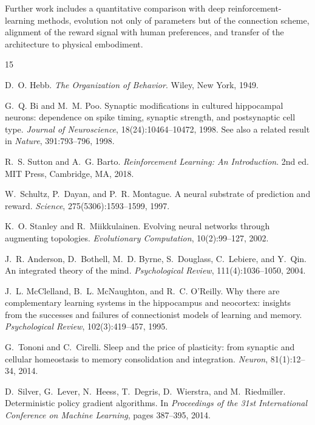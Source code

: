 \documentclass[11pt,a4paper]{article}
\begin{document}
Further work includes a quantitative comparison with deep reinforcement-learning methods, evolution not only of parameters but of the connection scheme, alignment of the reward signal with human preferences, and transfer of the architecture to physical embodiment.

\begin{thebibliography}{15}

D.~O. Hebb.
\newblock \emph{The Organization of Behavior}.
\newblock Wiley, New York, 1949.

G.~Q. Bi and M.~M. Poo.
\newblock Synaptic modifications in cultured hippocampal neurons: dependence on spike timing, synaptic strength, and postsynaptic cell type.
\newblock \emph{Journal of Neuroscience}, 18(24):10464--10472, 1998.
\newblock See also a related result in \emph{Nature}, 391:793--796, 1998.

R.~S. Sutton and A.~G. Barto.
\newblock \emph{Reinforcement Learning: An Introduction}.
\newblock 2nd ed. MIT Press, Cambridge, MA, 2018.

W.~Schultz, P.~Dayan, and P.~R. Montague.
\newblock A neural substrate of prediction and reward.
\newblock \emph{Science}, 275(5306):1593--1599, 1997.

K.~O. Stanley and R.~Miikkulainen.
\newblock Evolving neural networks through augmenting topologies.
\newblock \emph{Evolutionary Computation}, 10(2):99--127, 2002.

J.~R. Anderson, D.~Bothell, M.~D. Byrne, S.~Douglass, C.~Lebiere, and Y.~Qin.
\newblock An integrated theory of the mind.
\newblock \emph{Psychological Review}, 111(4):1036--1050, 2004.

J.~L. McClelland, B.~L. McNaughton, and R.~C. O'Reilly.
\newblock Why there are complementary learning systems in the hippocampus and neocortex: insights from the successes and failures of connectionist models of learning and memory.
\newblock \emph{Psychological Review}, 102(3):419--457, 1995.

G.~Tononi and C.~Cirelli.
\newblock Sleep and the price of plasticity: from synaptic and cellular homeostasis to memory consolidation and integration.
\newblock \emph{Neuron}, 81(1):12--34, 2014.

D.~Silver, G.~Lever, N.~Heess, T.~Degris, D.~Wierstra, and M.~Riedmiller.
\newblock Deterministic policy gradient algorithms.
\newblock In \emph{Proceedings of the 31st International Conference on Machine Learning}, pages 387--395, 2014.


\end{thebibliography}
\end{document}

